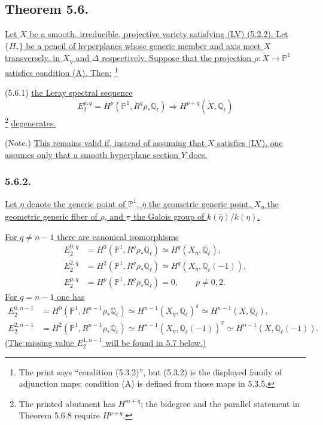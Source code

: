 \subsection*{Theorem 5.6.}
\underline{Let $X$ be a smooth, irreducible, projective variety satisfying
(LV) (5.2.2).  Let $\{H_\tau\}$ be a pencil of hyperplanes whose generic
member and axis meet $X$ transversely, in $X_\eta$ and $\Delta$ respectively.
Suppose that the projection
$\rho:\widetilde X\to\mathbb P^1$ satisfies condition (A).  Then:}
\footnote{The print says ``condition (5.3.2)'', but (5.3.2) is the displayed
family of adjunction maps; condition (A) is defined from those maps in 5.3.5.}

\smallskip
\noindent
\textup{(5.6.1)}\quad
\underline{the Leray spectral sequence}
\[
E_2^{p,q}=H^p(\mathbb P^1,R^q\rho_*\mathbb Q_\ell)
\Longrightarrow H^{p+q}(\widetilde X,\mathbb Q_\ell)
\]
\footnote{The printed abutment has $H^{m+q}$; the bidegree and the parallel
statement in Theorem 5.6.8 require $H^{p+q}$.}
\underline{degenerates.}

\noindent
\textup{(Note.)}\quad
\underline{This remains valid if, instead of assuming that $X$ satisfies
(LV), one assumes only that a smooth hyperplane section $Y$ does.}

\subsubsection*{5.6.2.}
\underline{Let $\eta$ denote the generic point of $\mathbb P^1$,
$\bar\eta$ the geometric generic point, $X_{\bar\eta}$ the geometric generic
fiber of $\rho$, and $\pi$ the Galois group of
$k(\bar\eta)/k(\eta)$.}

\underline{For $q\neq n-1$ there are canonical isomorphisms}
\begin{align}
E_2^{0,q}
 &=H^0(\mathbb P^1,R^q\rho_*\mathbb Q_\ell)
 \simeq H^q(X_{\bar\eta},\mathbb Q_\ell),
 \tag{5.6.2.1}\\
E_2^{2,q}
 &=H^2(\mathbb P^1,R^q\rho_*\mathbb Q_\ell)
 \simeq H^q(X_{\bar\eta},\mathbb Q_\ell(-1)),
 \tag{5.6.2.2}\\
E_2^{p,q}
 &=H^p(\mathbb P^1,R^q\rho_*\mathbb Q_\ell)=0,
 \qquad p\neq0,2.
 \tag{5.6.2.3}
\end{align}
\underline{For $q=n-1$ one has}
\begin{align}
E_2^{0,n-1}
 &=H^0(\mathbb P^1,R^{n-1}\rho_*\mathbb Q_\ell)
 \simeq H^{n-1}(X_{\bar\eta},\mathbb Q_\ell)^\pi
 \simeq H^{n-1}(X,\mathbb Q_\ell),
 \tag{5.6.2.4}\\
E_2^{2,n-1}
 &=H^2(\mathbb P^1,R^{n-1}\rho_*\mathbb Q_\ell)
 \simeq H^{n-1}(X_{\bar\eta},\mathbb Q_\ell(-1))^\pi
 \simeq H^{n-1}(X,\mathbb Q_\ell(-1)).
 \tag{5.6.2.5}
\end{align}
\underline{(The missing value $E_2^{1,n-1}$ will be found in 5.7 below.)}

